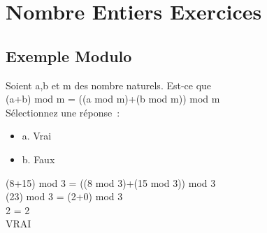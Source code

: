 \newpage

\chapter{Nombre Entiers Exercices}
\vspace{5mm} %

\section{Exemple Modulo}
\vspace{3mm} %

Soient a,b et m des nombre naturels. Est-ce que\\
(a+b) mod m = ((a mod m)+(b mod m)) mod m \\

Sélectionnez une réponse : \\

\begin{itemize}[label=$\square$]
\item {a. Vrai}
\item {b. Faux}
\end{itemize}

(8+15) mod 3 = ((8 mod 3)+(15 mod 3)) mod 3 \\
(23) mod 3 = (2+0) mod 3 \\
2 = 2 \\
VRAI \\
